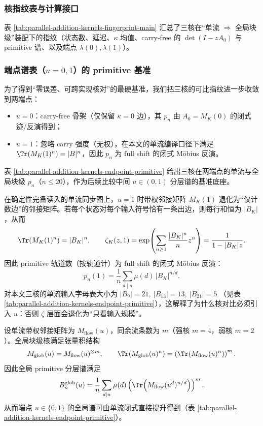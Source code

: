 \subsubsection{核指纹表与计算接口}
表 \ref{tab:parallel-addition-kernels-fingerprint-main} 汇总了三核在“单流 $\Rightarrow$ 全局块级”装配下的指纹（状态数、延迟、$\kappa$ 均值、carry-free 的 $\det(I-zA_0)$ 与 primitive 谱、以及端点 $\lambda(0),\lambda(1)$）。


\subsubsection{端点谱表（\texorpdfstring{$u=0,1$}{u=0,1}）的 primitive 基准}\label{subsec:kernel-endpoint-primitive}
为了得到“零误差、可跨实现核对”的最硬基准，我们把三核的可比指纹进一步收敛到两端点：
\begin{itemize}
  \item $u=0$：carry-free 骨架（仅保留 $\kappa=0$ 边），其 $p_n$ 由 $A_0=M_K(0)$ 的闭式迹/反演得到；
  \item $u=1$：忽略 carry 强度（无权），在本文的单流编译口径下满足 $\Tr(M_K(1)^n)=|B|^n$，因此 $p_n$ 为 full shift 的闭式 Möbius 反演。
\end{itemize}
表 \ref{tab:parallel-addition-kernels-endpoint-primitive} 给出三核在两端点的单流与全局块级 $p_n$（$n\le 20$），作为后续比较中间 $u\in(0,1)$ 分层谱的基准底座。


\begin{corollary}[\texorpdfstring{$u=1$}{u=1} 的无权退化：仅看输入规模的 full shift 基线]\label{cor:par-add-u1-degeneracy}
在确定性完备读入的单流同步图上，$u=1$ 时带权邻接矩阵 $M_K(1)$ 退化为“仅计数边”的邻接矩阵。若每个状态对每个输入符号恰有一条出边，则每行和恒为 $|B_K|$，从而
\[
\Tr(M_K(1)^n)=|B_K|^n,\qquad
\zeta_K(z,1)=\exp\!\left(\sum_{n\ge 1}\frac{|B_K|^n}{n}z^n\right)=\frac{1}{1-|B_K|z}.
\]
因此 primitive 轨道数（按轨道计）为 full shift 的闭式 Möbius 反演：
\[
p_n(1)=\frac{1}{n}\sum_{d\mid n}\mu(d)\,|B_K|^{n/d}.
\]
对本文三核的单流输入字母表大小为
\(
|B_9|=21,\ |B_{13}|=13,\ |B_{21}|=5
\)
（见表 \ref{tab:parallel-addition-kernels-endpoint-primitive}），这解释了为什么核对比必须引入 $u$：否则 $\zeta$ 层面会退化为“只看输入规模”。
\end{corollary}

\begin{corollary}\label{cor:par-add-global-lift-endpoints}
设单流带权邻接矩阵为 $M_{\mathrm{flow}}(u)$，同余流条数为 $m$（强核 $m=4$，弱核 $m=2$）。全局块级核满足张量积结构
\[
M_{\mathrm{glob}}(u)=M_{\mathrm{flow}}(u)^{\otimes m},
\qquad
\Tr(M_{\mathrm{glob}}(u)^n)=\left(\Tr(M_{\mathrm{flow}}(u)^n)\right)^m.
\]
因此全局 primitive 分层谱满足
\[
B^{\mathrm{glob}}_{n}(u)=\frac{1}{n}\sum_{d\mid n}\mu(d)\left(\Tr\!\left(M_{\mathrm{flow}}(u^d)^{n/d}\right)\right)^m,
\]
从而端点 $u\in\{0,1\}$ 的全局谱可由单流闭式直接提升得到（表 \ref{tab:parallel-addition-kernels-endpoint-primitive}）。
\end{corollary}

